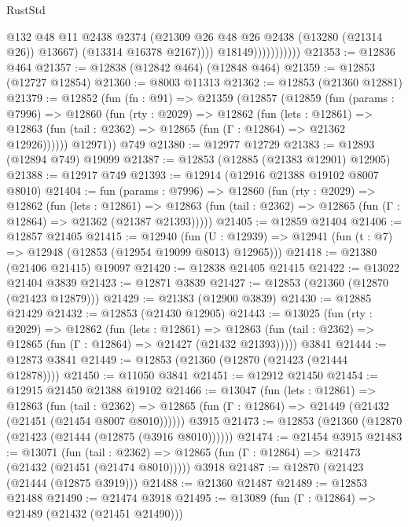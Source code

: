 \begin{lexlean}{RustStd}
\begin{coremodule}
                                @132
                                @48
                                @11
                                @2438
                                @2374
                                (@21309 @26 @48 @26 @2438 (@13280 (@21314 @26)) @13667)
                                (@13314 @16378 @2167))))
                          @18149)))))))))))
@21353 := @12836 @464
@21357 := @12838 (@12842 @464) (@12848 @464)
@21359 := @12853 (@12727 @12854)
@21360 := @8003 @11313
@21362 := @12853 (@21360 @12881)
@21379 := @12852
    (fun (fn : @91) =>
    @21359
      (@12857
        (@12859
          (fun (params : @7996) =>
          @12860
            (fun (rty : @2029) =>
            @12862
              (fun (lets : @12861) =>
              @12863 (fun (tail : @2362) => @12865 (fun (Γ : @12864) => @21362 @12926))))))
        @12971))
    @749
@21380 := @12977 @12729
@21383 := @12893 (@12894 @749) @19099
@21387 := @12853 (@12885 (@21383 @12901) @12905)
@21388 := @12917 @749
@21393 := @12914 (@12916 @21388 @19102 @8007 @8010)
@21404 := fun (params : @7996) =>
  @12860
    (fun (rty : @2029) =>
    @12862
      (fun (lets : @12861) =>
      @12863 (fun (tail : @2362) => @12865 (fun (Γ : @12864) => @21362 (@21387 @21393)))))
@21405 := @12859 @21404
@21406 := @12857 @21405
@21415 := @12940
    (fun (U : @12939) => @12941 (fun (t : @7) => @12948 (@12853 (@12954 @19099 @8013) @12965)))
@21418 := @21380 (@21406 @21415) @19097
@21420 := @12838 @21405 @21415
@21422 := @13022 @21404 @3839
@21423 := @12871 @3839
@21427 := @12853 (@21360 (@12870 (@21423 @12879)))
@21429 := @21383 (@12900 @3839)
@21430 := @12885 @21429
@21432 := @12853 (@21430 @12905)
@21443 := @13025
    (fun (rty : @2029) =>
    @12862
      (fun (lets : @12861) =>
      @12863 (fun (tail : @2362) => @12865 (fun (Γ : @12864) => @21427 (@21432 @21393)))))
    @3841
@21444 := @12873 @3841
@21449 := @12853 (@21360 (@12870 (@21423 (@21444 @12878))))
@21450 := @11050 @3841
@21451 := @12912 @21450
@21454 := @12915 @21450 @21388 @19102
@21466 := @13047
    (fun (lets : @12861) =>
    @12863
      (fun (tail : @2362) =>
      @12865 (fun (Γ : @12864) => @21449 (@21432 (@21451 (@21454 @8007 @8010))))))
    @3915
@21473 := @12853 (@21360 (@12870 (@21423 (@21444 (@12875 (@3916 @8010))))))
@21474 := @21454 @3915
@21483 := @13071
    (fun (tail : @2362) => @12865 (fun (Γ : @12864) => @21473 (@21432 (@21451 (@21474 @8010)))))
    @3918
@21487 := @12870 (@21423 (@21444 (@12875 @3919)))
@21488 := @21360 @21487
@21489 := @12853 @21488
@21490 := @21474 @3918
@21495 := @13089 (fun (Γ : @12864) => @21489 (@21432 (@21451 @21490)))

\end{coremodule}
\end{lexlean}

